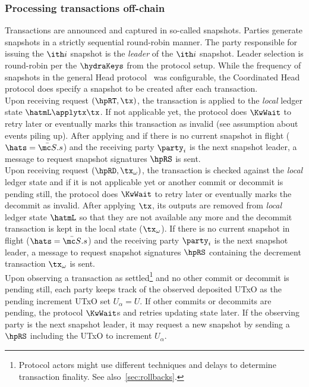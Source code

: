 \subsubsection{Processing transactions off-chain}

Transactions are announced and captured in so-called snapshots. Parties generate
snapshots in a strictly sequential round-robin manner. The party responsible for
issuing the $\ith i$ snapshot is the \emph{leader} of the $\ith i$ snapshot.
Leader selection is round-robin per the $\hydraKeys$ from the protocol setup.
While the frequency of snapshots in the general Head protocol~\cite{hydrahead20}
was configurable, the Coordinated Head protocol does specify a snapshot to be
created after each transaction.\\

\quad Upon receiving request $(\hpRT,\tx)$, the transaction is
applied to the \emph{local} ledger state $\hatmL \applytx \tx$. If not
applicable yet, the protocol does $\KwWait$ to retry later or eventually marks
this transaction as invalid (see assumption about events piling up). After
applying and if there is no current snapshot in flight ($\hats = \bar{\mc S}.s$) and the
receiving party $\party_{i}$ is the next snapshot
leader, a message to request snapshot signatures $\hpRS$ is sent. \\

\quad Upon receiving request $(\hpRD,\tx_\omega)$, the transaction
is checked against the \emph{local} ledger state and if it is not applicable yet
or another commit or decommit is pending still, the protocol does $\KwWait$ to
retry later or eventually marks the decommit as invalid. After applying $\tx$,
its outputs are removed from \emph{local} ledger state $\hatmL$ so that they are
not available any more and the decommit transaction is kept in the local state
($\tx_\omega$). If there is no current snapshot in flight ($\hats = \bar{\mc S}.s$)
and the receiving party $\party_{i}$ is the next snapshot leader, a message to
request snapshot signatures $\hpRS$ containing the decrement transaction $\tx_\omega$ is sent. \\

\quad Upon observing a \mtxDeposit{}
  transaction as settled\footnote{Protocol actors might use different techniques
    and delays to determine transaction finality. See also~\ref{sec:rollbacks}.}
  and no other commit or decommit is pending still, each party keeps track of
  the observed deposited UTxO as the pending increment UTxO set $U_{\alpha} = U$. If
  other commits or decommits are pending, the protocol $\KwWait$s and retries
  updating state later. If the observing party is the
  next snapshot leader, it may request a new snapshot by sending a $\hpRS$
  including the UTxO to increment $U_{\alpha}$.  \\

